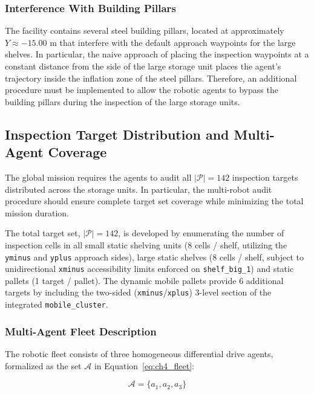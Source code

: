 \subsubsection{Interference With Building Pillars}

The facility contains several steel building pillars, located at approximately $Y \approx -15.00\text{ m}$ that interfere with the default approach waypoints for the large shelves. In particular, the naive approach of placing the inspection waypoints at a constant distance from the side of the large storage unit places the agent's trajectory inside the inflation zone of the steel pillars. Therefore, an additional procedure must be implemented to allow the robotic agents to bypass the building pillars during the inspection of the large storage units.

\subsection{Inspection Target Distribution and Multi-Agent Coverage}

The global mission requires the agents to audit all $|\mathcal{P}| = 142$ inspection targets distributed across the storage units. In particular, the multi-robot audit procedure should ensure complete target set coverage while minimizing the total mission duration.

The total target set, $ |\mathcal{P}| = 142 $, is developed by enumerating the number of inspection cells in all small static shelving units (8 cells / shelf, utilizing the \texttt{yminus} and \texttt{yplus} approach sides), large static shelves (8 cells / shelf, subject to unidirectional \texttt{xminus} accessibility limits enforced on \texttt{shelf\_big\_1}) and static pallets (1 target / pallet). The dynamic mobile pallets provide 6 additional targets by including the two-sided (\texttt{xminus}/\texttt{xplus}) 3-level section of the integrated \texttt{mobile\_cluster}.


\subsubsection{Multi-Agent Fleet Description}

The robotic fleet consists of three homogeneous differential drive agents, formalized as the set $\mathcal{A}$ in Equation~\eqref{eq:ch4_fleet}:

\begin{equation}
\mathcal{A} = \{ a_1, a_2, a_3 \} \label{eq:ch4_fleet}
\end{equation}

